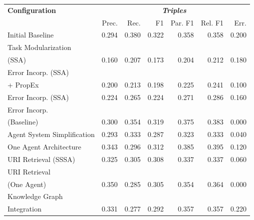 \documentclass[a4paper,oneside,bibliography=totoc]{scrbook}
\begin{document}
\begin{table}[h]
  \centering
  \begin{tabular}{p{5cm}|rrrrrr}
    \toprule
    \textbf{Configuration}      & \multicolumn{6}{c}{\textit{\textbf{Triples}}}                                             \\
                                & Prec.                                         & Rec.  & F1    & Par. F1 & Rel. F1 & Err.  \\
    \midrule
    Initial Baseline            & 0.294                                         & 0.380 & 0.322 & 0.358   & 0.358   & 0.200 \\
    Task Modularization                                                                                                     \\(SSA) & 0.160 & 0.207 & 0.173 & 0.204 & 0.212 & 0.180 \\
    Error Incorp. (SSA)                                                                                                     \\ + PropEx & 0.200 & 0.213 & 0.198 & 0.225 & 0.241 & 0.100 \\
    Error Incorp. (SSA)         & 0.224                                         & 0.265 & 0.224 & 0.271   & 0.286   & 0.160 \\
    Error Incorp.                                                                                                           \\(Baseline) & 0.300 & 0.354 & 0.319 & 0.375 & 0.383 & 0.000 \\
    Agent System Simplification & 0.293                                         & 0.333 & 0.287 & 0.323   & 0.333   & 0.040 \\
    One Agent Architecture      & 0.343                                         & 0.296 & 0.312 & 0.385   & 0.395   & 0.120 \\
    URI Retrieval (SSSA)        & 0.325                                         & 0.305 & 0.308 & 0.337   & 0.337   & 0.060 \\
    URI Retrieval                                                                                                           \\(One Agent) & 0.350 & 0.285 & 0.305 & 0.354 & 0.364 & 0.000 \\
    Knowledge Graph                                                                                                         \\Integration & 0.331 & 0.277 & 0.292 & 0.357 & 0.357 & 0.220 \\

\end{tabular}
\end{table}
\end{document}
